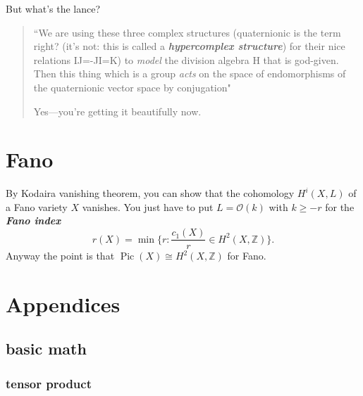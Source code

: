 But what's the lance?
\begin{quotation}
	``We are using these three complex structures (quaternionic is the term right? (it's not: this is called a \textit{\textbf{hypercomplex structure}}) for their nice relations IJ=-JI=K) to \textit{model} the division algebra H that is god-given. Then this thing which is a group \textit{acts} on the space of endomorphisms of the quaternionic vector space by conjugation"

	\vspace{1em}
	\hfill Yes---you're getting it beautifully now.
\end{quotation}


\section{Fano}

\begin{exercise}\leavevmode
By Kodaira vanishing theorem, you can show that the cohomology \(H^{i}(X,L)\) of a Fano variety \(X\) vanishes. You just have to put \(L=\mathcal{O}(k)\) with \(k\geq  -r\) for the \textit{\textbf{Fano index}} 
\[r(X)=\operatorname{min}\{r:\frac{c_1(X)}{r}\in H^{2}(X,\mathbb{Z})\}.\]
Anyway the point is that \(\operatorname{Pic}(X)\cong H^{2}(X,\mathbb{Z})\) for Fano.
\end{exercise}

\section{Appendices}

\subsection{basic math}

\subsubsection{tensor product}

